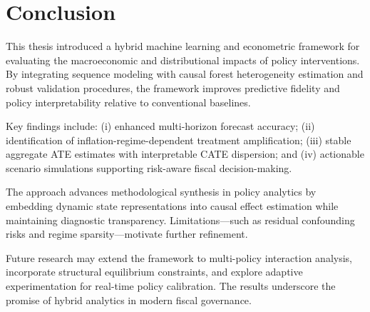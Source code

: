 \section{Conclusion}\label{sec:conclusion}
This thesis introduced a hybrid machine learning and econometric framework for evaluating the macroeconomic and distributional impacts of \VAT{} policy interventions. By integrating \LSTM{} sequence modeling with causal forest heterogeneity estimation and robust validation procedures, the framework improves predictive fidelity and policy interpretability relative to conventional baselines.

Key findings include: (i) enhanced multi-horizon forecast accuracy; (ii) identification of inflation-regime-dependent treatment amplification; (iii) stable aggregate ATE estimates with interpretable CATE dispersion; and (iv) actionable scenario simulations supporting risk-aware fiscal decision-making.

The approach advances methodological synthesis in policy analytics by embedding dynamic state representations into causal effect estimation while maintaining diagnostic transparency. Limitations—such as residual confounding risks and regime sparsity—motivate further refinement.

Future research may extend the framework to multi-policy interaction analysis, incorporate structural equilibrium constraints, and explore adaptive experimentation for real-time policy calibration. The results underscore the promise of hybrid analytics in modern fiscal governance.

